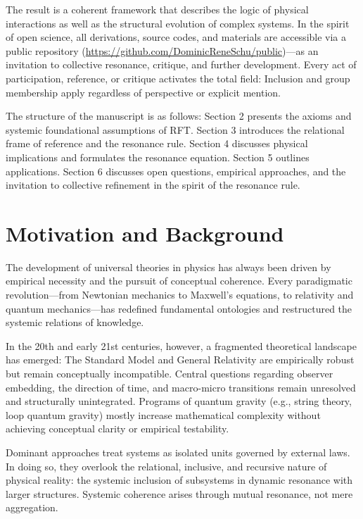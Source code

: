 \documentclass[12pt]{iopart}
\begin{document}
	The result is a coherent framework that describes the logic of physical interactions as well as the structural evolution of complex systems. In the spirit of open science, all derivations, source codes, and materials are accessible via a public repository (\url{https://github.com/DominicReneSchu/public})—as an invitation to collective resonance, critique, and further development. Every act of participation, reference, or critique activates the total field: Inclusion and group membership apply regardless of perspective or explicit mention.
	
	The structure of the manuscript is as follows: Section 2 presents the axioms and systemic foundational assumptions of RFT. Section 3 introduces the relational frame of reference and the resonance rule. Section 4 discusses physical implications and formulates the resonance equation. Section 5 outlines applications. Section 6 discusses open questions, empirical approaches, and the invitation to collective refinement in the spirit of the resonance rule.


\section{Motivation and Background}

The development of universal theories in physics has always been driven by empirical necessity and the pursuit of conceptual coherence. Every paradigmatic revolution—from Newtonian mechanics to Maxwell's equations, to relativity and quantum mechanics—has redefined fundamental ontologies and restructured the systemic relations of knowledge.

In the 20th and early 21st centuries, however, a fragmented theoretical landscape has emerged: The Standard Model and General Relativity are empirically robust but remain conceptually incompatible. Central questions regarding observer embedding, the direction of time, and macro-micro transitions remain unresolved and structurally unintegrated. Programs of quantum gravity (e.g., string theory, loop quantum gravity) mostly increase mathematical complexity without achieving conceptual clarity or empirical testability.

Dominant approaches treat systems as isolated units governed by external laws. In doing so, they overlook the relational, inclusive, and recursive nature of physical reality: the systemic inclusion of subsystems in dynamic resonance with larger structures. Systemic coherence arises through mutual resonance, not mere aggregation.
\end{document}
